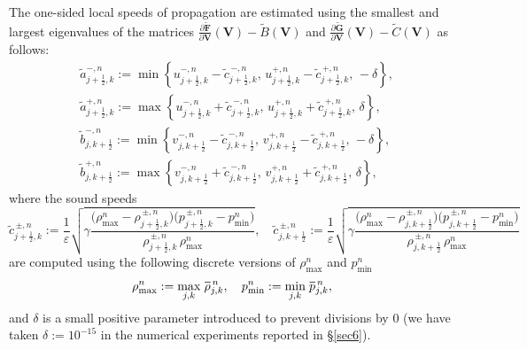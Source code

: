 \documentclass[A4paper,12pt,twoside]{article}
\numberwithin{equation}{section}
\numberwithin{figure}{section}
\numberwithin{table}{section}
\newcommand{\kph}{{k+\frac{1}{2}}}
\newcommand{\jph}{{j+\frac{1}{2}}}
\newcommand{\mF}{\bm{F}}
\newcommand{\mG}{\bm{G}}
\newcommand{\ve}{\varepsilon}
\newcommand*\xbar[1]{%
  \hbox{%
    \vbox{%
      \hrule height 0.5pt %
      \kern0.4ex%
      \hbox{%
        \kern-0.05em%
        \ensuremath{#1}%
        \kern-0.00em%
      }%
    }%
  }%
}
\begin{document}
The one-sided local speeds of propagation are estimated using the smallest and largest eigenvalues of the matrices
$\frac{\partial\widetilde{\mF}}{\partial\bm V}(\bm V)-\widetilde B(\bm V)$ and
$\frac{\partial\widetilde{\mG}}{\partial\bm V}(\bm V)-\widetilde C(\bm V)$ as follows:
\begin{equation}
\begin{aligned}
&\tilde a^{-,n}_{\jph,k}:=\min\left\{u^{-,n}_{\jph,k}-\tilde c^{\,-,n}_{\jph,k},\,u^{+,n}_{\jph,k}-\tilde c^{\,+,n}_{\jph,k},\,-\delta
\right\},\\
&\tilde a^{+,n}_{\jph,k}:=\max\left\{u^{-,n}_{\jph,k}+\tilde c^{\,-,n}_{\jph,k},\,u^{+,n}_{\jph,k}+\tilde c^{\,+,n}_{\jph,k},\,
\delta\right\},\\
&\tilde b^{-,n}_{j,\kph}:=\min\left\{v^{-,n}_{j,\kph}-\tilde c^{\,-,n}_{j,\kph},\,v^{+,n}_{j,\kph}-\tilde c^{\,+,n}_{j,\kph},\,
-\delta\right\},\\
&\tilde b^{+,n}_{j,\kph}:=\max\left\{v^{-,n}_{j,\kph}+\tilde c^{\,-,n}_{j,\kph},\,v^{+,n}_{j,\kph}+\tilde c^{\,+,n}_{j,\kph},\,
\delta\right\},
\end{aligned}
\label{4.49}
\end{equation}
where the sound speeds
$$
\tilde c^{\,\pm,n}_{\jph,k}:=\frac{1}{\ve}\sqrt{\gamma\frac{\big(\rho_{\max}^n-\rho^{\,\pm,n}_{\jph,k}\big)
\big(p^{\,\pm,n}_{\jph,k}-p_{\min}^n)}{\rho^{\,\pm,n}_{\jph,k}\,\rho_{\max}^n}},\quad
\tilde c^{\,\pm,n}_{j,\kph}:=\frac{1}{\ve}\sqrt{\gamma\frac{\big(\rho_{\max}^n-\rho^{\,\pm,n}_{j,\kph}\big)
\big(p^{\,\pm,n}_{j,\kph}-p_{\min}^n)}{\rho^{\,\pm,n}_{j,\kph}\,\rho_{\max}^n}}
$$
are computed using the following discrete versions of $\rho_{\max}^n$ and $p_{\min}^n$
\begin{equation}
\rho_{\max}^n:=\max\limits_{j,k}\,\xbar{\rho}_{j,k}^{\,n},\quad p_{\min}^n:=\min\limits_{j,k}\,\xbar p_{j,k}^{\,n},
\label{3.35}
\end{equation}
and $\delta$ is a small positive parameter introduced to prevent divisions by $0$ (we have taken $\delta:=10^{-15}$ in the numerical
experiments reported in \S\ref{sec6}).
\end{document}
